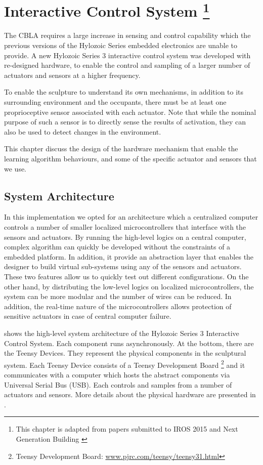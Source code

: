 \chapter[Interactive Control System]
{Interactive Control System 
	\footnote{This chapter is adapted from papers submitted to IROS 2015 \cite{Chan2015} and Next Generation Building \cite{Gorbet2015}}} 
\label{chap:ctrl_system}

The CBLA requires a large increase in sensing and control capability which the previous versions of the Hylozoic Series embedded electronics \cite{Beesley2007.book} are unable to provide. A new Hylozoic Series 3 interactive control system was developed with re-designed hardware, to enable the control and sampling of a larger number of actuators and sensors at a higher frequency. 

To enable the sculpture to understand its own mechanisms, in addition to its surrounding environment and the occupants, there must be at least one proprioceptive sensor associated with each actuator. Note that while the nominal purpose of such a sensor is to directly sense the results of activation, they can also be used to detect changes in the environment.

This chapter discuss the design of the hardware mechanism that enable the learning algorithm behaviours, and some of the specific actuator and sensors that we use. 


\section{System Architecture}

In this implementation we opted for an architecture which a centralized computer controls a number of smaller localized microcontrollers that interface with the sensors and actuators. By running the high-level logics on a central computer, complex algorithm can quickly be developed without the constraints of a embedded platform. In addition, it provide an abstraction layer that enables the designer to build virtual sub-systems using any of the sensors and actuators. These two features allow us to quickly test out different configurations. On the other hand, by distributing the low-level logics on localized microcontrollers, the system can be more modular and the number of wires can be reduced. In addition, the real-time nature of the microcontrollers allows protection of sensitive actuators in case of central computer failure. 

 shows the high-level system architecture of the Hylozoic Series 3 Interactive Control System. Each component runs asynchronously. At the bottom, there are the Teensy Devices. They represent the physical components in the sculptural system. Each Teensy Device consists of a Teensy Development Board \footnote{Teensy Development Board: \url{www.pjrc.com/teensy/teensy31.html}} and it communicates with a computer which hosts the abstract components via Universal Serial Bus (USB). Each controls and samples from a number of actuators and sensors. More details about the physical hardware are presented in . 

